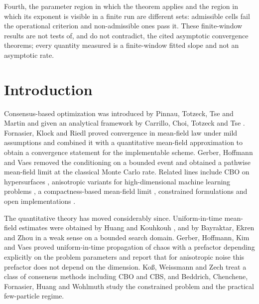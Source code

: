 \documentclass[pdflatex,sn-mathphys-num]{sn-jnl}
\theoremstyle{thmstyleone}
\theoremstyle{thmstyletwo}
\theoremstyle{thmstylethree}
\begin{document}
{Fourth, the parameter region in which the theorem applies and the region in which its exponent is visible in a finite run are different sets: admissible cells fail the operational criterion and non-admissible ones pass it. These finite-window results are not tests of, and do not contradict, the cited asymptotic convergence theorems; every quantity measured is a finite-window fitted slope and not an asymptotic rate.}



\maketitle

\section{Introduction}\label{sec1}

Consensus-based optimization was introduced by Pinnau, Totzeck, Tse and Martin \cite{pinnau2017} and given an analytical framework by Carrillo, Choi, Totzeck and Tse \cite{carrillo2018}. Fornasier, Klock and Riedl \cite{fkr2024} proved convergence in mean-field law under mild assumptions and combined it with a quantitative mean-field approximation to obtain a convergence statement for the implementable scheme. Gerber, Hoffmann and Vaes \cite{ghv2025} removed the conditioning on a bounded event and obtained a pathwise mean-field limit at the classical Monte Carlo rate. Related lines include CBO on hypersurfaces \cite{fhps2020}, anisotropic variants for high-dimensional machine learning problems \cite{carrillo2021}, a compactness-based mean-field limit \cite{huangqiu2022}, constrained formulations \cite{borghi2023} and open implementations \cite{cbx2024}.

The quantitative theory has moved considerably since. Uniform-in-time mean-field estimates were obtained by Huang and Kouhkouh \cite{hk2025}, and by Bayraktar, Ekren and Zhou \cite{bez2026} in a weak sense on a bounded search domain. Gerber, Hoffmann, Kim and Vaes \cite{ghkv2025} proved uniform-in-time propagation of chaos with a prefactor depending explicitly on the problem parameters and report that for anisotropic noise this prefactor does not depend on the dimension. Ko\ss{}, Weissmann and Zech \cite{kwz2024} treat a class of consensus methods including CBO and CBS, and Beddrich, Chenchene, Fornasier, Huang and Wohlmuth \cite{beddrich2024} study the constrained problem and the practical few-particle regime.
\end{document}
